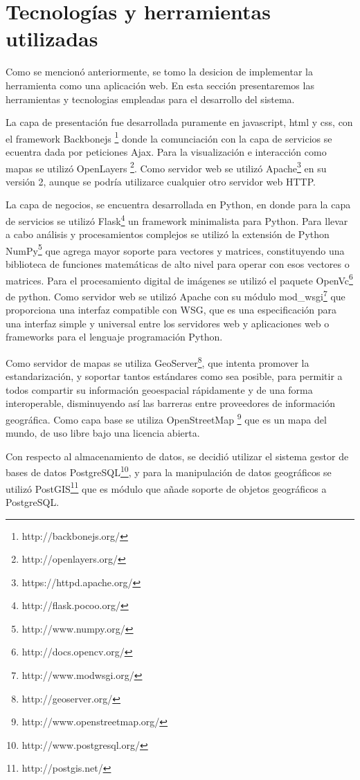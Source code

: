\section{Tecnologías y herramientas utilizadas}
Como se mencionó anteriormente, se tomo la desicion de implementar la herramienta como una
aplicación web. En esta sección presentaremos las herramientas y tecnologias empleadas para el
desarrollo del sistema.

La capa de presentación fue desarrollada puramente en javascript, html y css, con el framework
Backbonejs \footnote{http://backbonejs.org/} donde la comunciación con la capa de servicios se ecuentra dada por peticiones Ajax. Para la visualización e interacción como mapas se utilizó
OpenLayers \footnote{http://openlayers.org/}. Como servidor web se utilizó
Apache\footnote{https://httpd.apache.org/} en su versión 2, aunque se podría utilizarce cualquier
otro servidor web HTTP.

La capa de negocios, se encuentra desarrollada en Python, en donde para la capa de servicios se
utilizó Flask\footnote{http://flask.pocoo.org/} un framework minimalista para Python. Para llevar
a cabo análisis y procesamientos complejos se utilizó la extensión de Python NumPy\footnote{http://www.numpy.org/} que agrega mayor soporte para vectores y matrices, constituyendo una
biblioteca de funciones matemáticas de alto nivel para operar con esos vectores o matrices. Para el procesamiento digital de imágenes se utilizó el paquete OpenVc\footnote{http://docs.opencv.org/}
de python. Como servidor web se utilizó Apache con su módulo mod\_wsgi\footnote{http://www.modwsgi.org/} que proporciona una interfaz compatible con WSG, que es una especificación para una interfaz
simple y universal entre los servidores web y aplicaciones web o frameworks para el lenguaje programación Python.

Como servidor de mapas se utiliza GeoServer\footnote{http://geoserver.org/}, que intenta promover
la estandarización, y soportar tantos estándares como sea posible, para permitir a todos compartir
su información geoespacial rápidamente y de una forma interoperable, disminuyendo así las barreras
entre proveedores de información geográfica. Como capa base se utiliza
OpenStreetMap \footnote{http://www.openstreetmap.org/} que es un mapa del mundo, de uso libre bajo
una licencia abierta.

Con respecto al almacenamiento de datos, se decidió utilizar el sistema gestor de bases de datos
PostgreSQL\footnote{http://www.postgresql.org/}, y para la manipulación de datos geográficos se
utilizó PostGIS\footnote{http://postgis.net/} que es módulo que añade soporte de objetos
geográficos a PostgreSQL.

